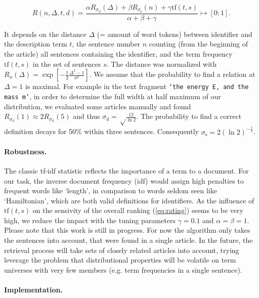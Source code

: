 \documentclass[runningheads]{llncs}
\begin{document}
\begin{equation} \label{eq:rating}
R(n,\Delta,t,d)=\frac{\alpha{R}_{\sigma_\mathrm d}(\Delta)
+\beta{R}_{\sigma_\mathrm s}(n)
+\gamma\mathrm{tf}(t,s)}{\alpha+\beta+\gamma} \mapsto [0;1].
\end{equation}

It depends on the distance $\Delta$ (= amount of word tokens) between
identifier and the description term $t$, the sentence number $n$ counting
(from the beginning of the article) all sentences containing the identifier,
and the term frequency $\mathrm{tf}(t,s)$ in the set of sentences $s$. The
distance was normalized with $R_\sigma(\Delta) = \exp\left[ -\frac{1}{2}
\frac{\Delta^2-1}{\sigma^2}\right].$ We assume that the probability to find a
relation at $\Delta=1$ is maximal. For example in the text fragment
\texttt{`the energy E, and the mass m'}, in order to determine the full width
at half maximum of our distribution, we evaluated some articles manually and
found $R_{\sigma_\mathrm d}(1)\approx 2 R_{\sigma_\mathrm d}(5)$ and thus
$\sigma_d=\sqrt\frac{12}{\ln 2}$. The probability to find a correct definition
decays for 50\% within three sentences. Consequently $\sigma_\mathrm
s=2\left({\ln 2}\right)^{-\frac{1}{2}}$.


\paragraph{Robustness.}

The classic tf-idf \cite{Salton86} statistic reflects the importance of a term
to a document. For our task, the inverse document frequency (idf) would assign
high penalties to frequent words like `length', in comparison to words seldom
seen like `Hamiltonian', which are both valid definitions for identifiers. As the
influence of $\mathrm{tf}(t,s)$ on the sensivity of the overall ranking
(\ref{eq:rating}) seems to be very high, we reduce the impact with the tuning
parameters $\gamma=0.1$ and $\alpha = \beta = 1$. Please note that this work
is still in progress. For now the algorithm only takes the sentences into
account, that were found in a single article. In the future, the retrieval
process will take sets of closely related articles into account, trying
leverage the problem that distributional properties will be volatile on term
universes with very few members (e.g. term frequencies in a single sentence).


\paragraph{Implementation.}
\end{document}
